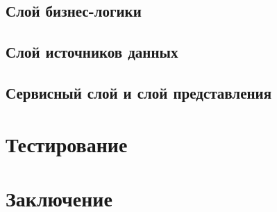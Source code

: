 \documentclass[12pt,a4paper,titlepage]{article}
\begin{document}
\subsection{Слой бизнес-логики}
\newpage
\subsection{Слой источников данных}
\newpage
\subsection{Сервисный слой и слой представления}
\newpage
\section{Тестирование}
\newpage
\section{Заключение}
\end{document}
